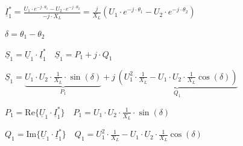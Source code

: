 $
\boxed{
\underline{I}_1^* = \frac{U_1 \cdot e^{-j \cdot \theta_1} - U_2 \cdot e^{-j \cdot \theta_2}}{-j \cdot X_L}
= \frac{j}{X_L} \left( U_1 \cdot e^{-j \cdot \theta_1} - U_2 \cdot e^{-j \cdot \theta_2} \right)
}
$

\vspace{0.15cm}

$\boxed{\delta = \theta_1 - \theta_2}$

\vspace{0.15cm}

$\boxed{\underline{S}_1 = \underline{U}_1 \cdot \underline{I}_1^*} \quad \boxed{\underline{S}_1 = {P}_1 + j \cdot {Q}_1} \quad  \quad $

$\boxed{
\underline{S}_1 = \underbrace{U_1 \cdot U_2 \cdot \frac{1}{X_L} \cdot \sin(\delta)}_{P_1}
+ j\, \underbrace{\left( U_1^2 \cdot \frac{1}{X_L} - U_1 \cdot U_2 \cdot \frac{1}{X_L} \cos(\delta) \right)}_{Q_1}}$

\vspace{0.15cm}

$
\boxed{P_1 = \text{Re}\{ \underline{U}_1 \cdot \underline{I}_1^*\}} \quad \boxed{P_1 = U_1 \cdot U_2 \cdot \frac{1}{X_L} \cdot \sin(\delta)}
$

\vspace{0.15cm}

$
\boxed{Q_1 = \text{Im}\{ \underline{U}_1 \cdot \underline{I}_1^*\}} \quad 
\boxed{Q_1 = U_1^2 \cdot \frac{1}{X_L} - U_1 \cdot U_2 \cdot \frac{1}{X_L} \cos(\delta)}
$

\vspace{0.15cm}

